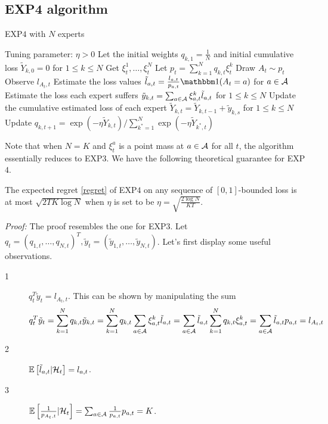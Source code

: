 \documentclass[11pt]{article}
\begin{document}
\subsection{EXP4 algorithm}
\begin{algorithm}
\caption{EXP$4$ with $N$ experts}\label{exp4}
\begin{algorithmic}[1]
\STATE Tuning parameter: $\eta>0$
\STATE Let the initial weights $q_{k,1}=\frac{1}{N}$ and initial cumulative loss $\tilde{Y}_{k,0}=0$ for $1\leq k\leq N$
\STATE Get $\xi_t^1,\ldots,\xi_t^N$
\STATE Let $p_t=\sum_{k=1}^Nq_{k,t}\xi_t^k$
\STATE Draw $A_t\sim p_t$
\STATE Observe $l_{A_t,t}$
\STATE Estimate the loss values $\tilde{l}_{a,t}=\frac{l_{a,t}}{p_{a,t}}\ind{(A_t=a)}$ for $a\in \mathcal{A}$
\STATE Estimate the loss each expert suffers $\tilde{y}_{k,t}=\sum_{a\in \mathcal{A}}\xi_{a,t}^k\tilde{l}_{a,t}$ for $1\leq k\leq N$
\STATE Update the cumulative estimated loss of each expert $\tilde{Y}_{k,t}=\tilde{Y}_{k,t-1}+\tilde{y}_{k,s}$ for $1\leq k\leq N$
\STATE Update $q_{k,t+1}= \exp(-\eta\tilde{Y}_{k,t})/\sum_{k^*=1}^N\exp(-\eta\tilde{Y}_{k^*,t})$
\ENDFOR
\end{algorithmic}
\end{algorithm}
Note that when $N=K$ and $\xi_t^a$ is a point mass at $a\in\mathcal{A}$ for all $t$, the algorithm essentially reduces to EXP$3$. We have the following theoretical guarantee for EXP$4$.
\begin{theorem}
The expected regret \eqref{regret} of EXP$4$ on any sequence of $[0,1]$-bounded loss is at most $\sqrt{2TK\log N}$ when $\eta$ is set to be $\eta=\sqrt{\frac{2\log N}{KT}}$.
\end{theorem}
\textit{Proof: }The proof resembles the one for EXP$3$. Let $q_t=(q_{1,t},\ldots,q_{N,t})^T,\tilde{y}_t=(\tilde{y}_{1,t},\ldots,\tilde{y}_{N,t})$. Let's first display some useful observations.
\begin{description}
\item[1] $q_t^T\tilde{y}_t=l_{A_t,t}$. This can be shown by manipulating the sum
\begin{equation*}
q_t^T\tilde{y}_t=\sum_{k=1}^Nq_{k,t}\tilde{y}_{k,t}=\sum_{k=1}^Nq_{k,t}\sum_{a\in \mathcal{A}}\xi_{a,t}^k\tilde{l}_{a,t}=\sum_{a\in \mathcal{A}}\tilde{l}_{a,t}\sum_{k=1}^Nq_{k,t}\xi_{a,t}^k=\sum_{a\in \mathcal{A}}\tilde{l}_{a,t}p_{a,t}=l_{A_t,t}
\end{equation*}
\item[2] $\mathbb{E}\left[ \tilde{l}_{a,t}\vert \mathcal{H}_t \right]=l_{a,t}$.
\item[3] $\mathbb{E}\left[ \frac{1}{p_{A_t,t}}\vert \mathcal{H}_t \right]=\sum_{a\in \mathcal{A}}\frac{1}{p_{a,t}}p_{a,t}=K$.
\end{description}
\end{document}
